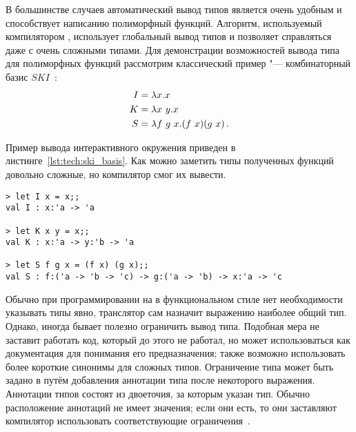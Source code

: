 В большинстве случаев автоматический вывод типов является очень удобным и способствует написанию полиморфный функций.
Алгоритм, используемый компилятором \fsharp{}, использует глобальный вывод типов и позволяет справляться даже с очень сложными типами.
Для демонстрации возможностей вывода типа для полиморфных функций рассмотрим классический пример "--- комбинаторный базис $SKI$~\cite[c.~21]{harrison_1997}:
\begin{align}
  I &= \lambda x . x \\
  K &= \lambda x\ y . x \\
  S &= \lambda f\ g\ x . (f\ x)(g\ x) \text{\,.}
\end{align}

Пример вывода интерактивного окружения \fsharp{} приведен в листинге~\ref{lst:tech:ski_basis}. 
Как можно заметить типы полученных функций довольно сложные, но компилятор смог их вывести.
\begin{lstlisting}[style=fsharpstyle,caption={Пример определения комбинаторного базиса $SKI$}, label=lst:tech:ski_basis]
> let I x = x;;
val I : x:'a -> 'a

> let K x y = x;;
val K : x:'a -> y:'b -> 'a

> let S f g x = (f x) (g x);;
val S : f:('a -> 'b -> 'c) -> g:('a -> 'b) -> x:'a -> 'c
\end{lstlisting}


Обычно при программировании на \fsharp{} в функциональном стиле нет необходимости указывать типы явно, транслятор сам назначит выражению наиболее общий тип.
Однако, иногда бывает полезно ограничить вывод типа. 
Подобная мера не заставит работать код, который до этого не работал, но может использоваться как документация для понимания его предназначения; также возможно использовать более короткие синонимы для сложных типов.
Ограничение типа может быть задано в \fsharp{} путём добавления аннотации типа после некоторого выражения. 
Аннотации типов состоят из двоеточия, за которым указан тип. 
Обычно расположение аннотаций не имеет значения; если они есть, то они заставляют компилятор использовать соответствующие ограничения~\cite[с.~59]{harrison_1997}. 


